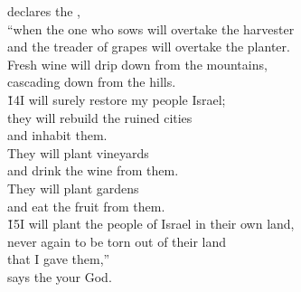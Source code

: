 \begin{poetry}
\poemll    declares the , \\
\poeml ``when the one who sows will overtake the harvester \\
\poemll    and the treader of grapes will overtake the planter. \\
\poeml Fresh wine will drip down from the mountains, \\
\poemll    cascading down from the hills. \\
\poeml \v{14}I will surely restore my people Israel; \\
\poemll    they will rebuild the ruined cities \\
\poemlll       and inhabit them. \\
\poeml They will plant vineyards \\
\poemll    and drink the wine from them. \\
\poeml They will plant gardens \\
\poemll    and eat the fruit from them. \\
\poeml \v{15}I will plant the people of Israel in their own land, \\
\poemll    never again to be torn out of their land \\
\poemlll       that I gave them,'' \\
\poemll    says the  your God.\end{poetry}
